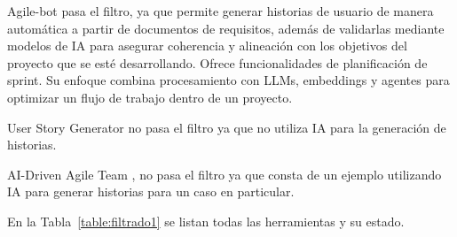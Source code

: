 Agile-bot \cite{agilebot} pasa el filtro, ya que permite generar historias de usuario de manera automática a partir de documentos de requisitos, además de validarlas mediante modelos de IA para asegurar coherencia y alineación con los objetivos del proyecto que se esté desarrollando. Ofrece funcionalidades de planificación de sprint. Su enfoque combina procesamiento con LLMs, embeddings y agentes para optimizar un flujo de trabajo dentro de un proyecto.

User Story Generator \cite{userstorygenerator} no pasa el filtro ya que no utiliza IA para la generación de historias.

AI-Driven Agile Team \cite{aidrivenagileteam}, no pasa el filtro ya que consta de un ejemplo utilizando IA para generar historias para un caso en particular.

En la Tabla~\ref{table:filtrado1} se listan todas las herramientas y su estado.

